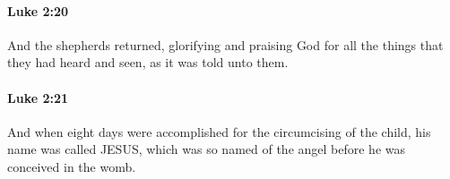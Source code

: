 		\paragraph{Luke 2:20} %
			\label{LUKE-2-20}

			And the shepherds returned, glorifying and praising God for all the things that they had heard and seen, as it was told unto them.

			\begin{framed}
			\scriptsize
				\begin{compactdesc}
					\item[SBLG] 
				\end{compactdesc}
			\end{framed}

		\paragraph{Luke 2:21} %
			\label{LUKE-2-21}

			And when eight days were accomplished for the circumcising of the child, his name was called JESUS, which was so named of the angel before he was conceived in the womb.

